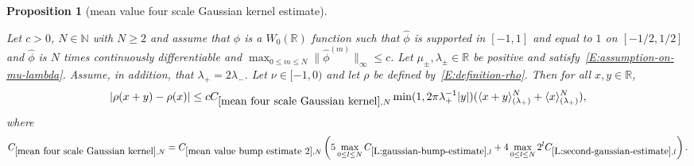 \documentclass[12pt,reqno]{amsart}
\theoremstyle{plain}
\newtheorem{proposition}[theorem]{Proposition}
\numberwithin{equation}{section}
\theoremstyle{remark}
\newcommand{\uses}[1]{}
\newcommand{\usesdefs}[1]{}
\newcommand{\leanok}{}
\newcommand{\lean}[1]{}
\newcommand{\R}{{\mathbb R}}
\begin{document}
\begin{proposition}[mean value four scale Gaussian kernel estimate]\label{mean four scale Gaussian kernel}\uses{L:gaussian-bump-decomposition,mean value bump estimate 2,L:gaussian-bump-estimate,L:second-gaussian-estimate}\usesdefs{gaussian,bracket bump,auto:Wiener-space-definition}
\lean{Auto.meanFourScaleGaussianKernel}
\leanok
Let $c>0$, $N\in \mathbb N$ with $N\geq 2$ and assume that $\phi$ is a $W_0(\R)$ function such that
$\widehat{\phi}$ is supported in $[-1,1]$ and equal to $1$ on $[-1/2,1/2]$ and $\widehat{\phi}$ is $N$ times continuously differentiable and $\max_{0\leq m \leq N} \|\widehat{\phi}^{(m)}\|_{\infty} \leq c$.
Let $\mu_\pm,\lambda_\pm\in\mathbb R$ be positive and satisfy~\eqref{E:assumption-on-mu-lambda}. Assume, in addition, that $\lambda_{+}=2\lambda_{-}$.
Let $\nu\in [-1,0)$ and let $\rho$ be defined by~\eqref{E:definition-rho}.
Then for all $x,y \in\mathbb{R}$,
\begin{equation}\label{E:mean-value}
|\rho(x+y)-\rho(x)| \le c C_{\ref{mean four scale Gaussian kernel},N} \min(1,2\pi \lambda_{+}^{-1}|y|) (\langle x+y\rangle^N_{(\lambda_+)}+
\langle x\rangle^N_{(\lambda_+)}),
\end{equation}
where
\begin{equation}\label{auto:mean-four-scale-Gaussian-constant} C_{\ref{mean four scale Gaussian kernel},N} = C_{\ref{mean value bump estimate 2},N}\left(5\max_{0\leq l \leq N} C_{\ref{L:gaussian-bump-estimate},l} +4\max_{0\leq l \leq N} 2^lC_{\ref{L:second-gaussian-estimate},l}\right).\end{equation}


\end{proposition}
\end{document}

